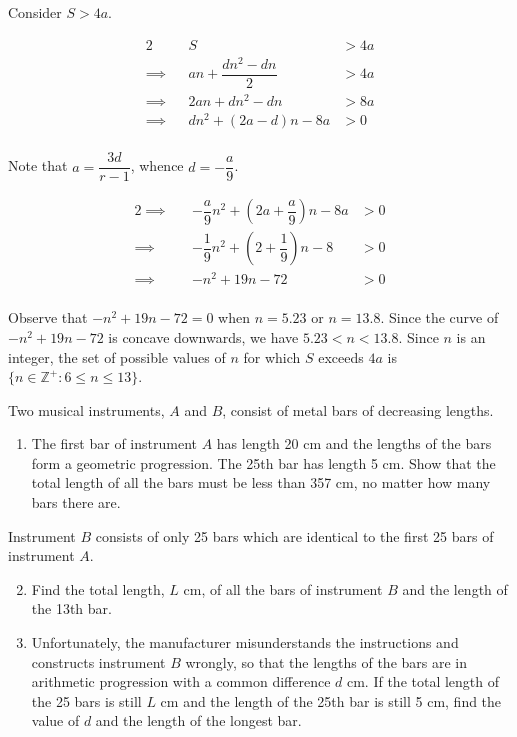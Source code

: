 \documentclass{jhwhw}
\begin{document}
            Consider $S > 4a$.

            \begin{alignat*}{2}
                &&S &> 4a\\
                \implies&&an + \dfrac{dn^2 - dn}2 &> 4a\\
                \implies&&2an + dn^2 - dn &> 8a\\
                \implies&& dn^2 + (2a-d)n - 8a &> 0\\
            \end{alignat*}

            Note that $a = \dfrac{3d}{r-1}$, whence $d = -\dfrac{a}9$.

            \begin{alignat*}{2}
                \implies&& -\dfrac{a}9n^2 + (2a+\dfrac{a}9)n - 8a &> 0\\
                \implies&& -\dfrac{1}9n^2 + (2+\dfrac{1}9)n - 8 &> 0\\
                \implies&& -n^2 + 19n - 72 &> 0\\             
            \end{alignat*}

            Observe that $-n^2 + 19n - 72 = 0$ when $n = 5.23$ or $n = 13.8$. Since the curve of $-n^2 + 19n - 72$ is concave downwards, we have $5.23 < n < 13.8$. Since $n$ is an integer, the set of possible values of $n$ for which $S$ exceeds $4a$ is $\{ n \in \mathbb{Z}^+ \colon 6 \leq n \leq 13\}$.


    \problem{}
        Two musical instruments, $A$ and $B$, consist of metal bars of decreasing lengths.

        \begin{enumerate}
            \item The first bar of instrument $A$ has length 20 cm and the lengths of the bars form a geometric progression. The 25th bar has length 5 cm. Show that the total length of all the bars must be less than 357 cm, no matter how many bars there are.
        \end{enumerate}

        \noindent Instrument $B$ consists of only 25 bars which are identical to the first 25 bars of instrument $A$.

        \begin{enumerate}
            \setcounter{enumi}{1}
            \item Find the total length, $L$ cm, of all the bars of instrument $B$ and the length of the 13th bar.
            \item Unfortunately, the manufacturer misunderstands the instructions and constructs instrument $B$ wrongly, so that the lengths of the bars are in arithmetic progression with a common difference $d$ cm. If the total length of the 25 bars is still $L$ cm and the length of the 25th bar is still 5 cm, find the value of $d$ and the length of the longest bar.
        \end{enumerate}
\end{document}
